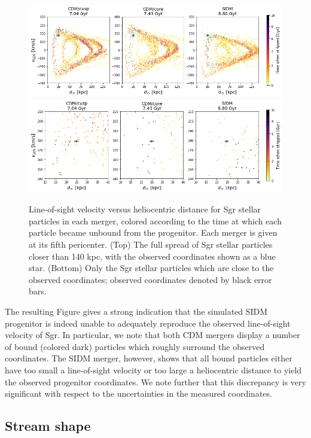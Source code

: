 \begin{figure}
    \centering
    \includegraphics[width=1.0\linewidth]{figs/vel_v_dist_peri_only.png}
    \includegraphics[width=1.0\linewidth]{figs/vel_v_dist_zoomed.png}
    \caption{%
        Line-of-sight velocity versus heliocentric distance for Sgr stellar
        particles in each merger, colored according to the time at which each
        particle became unbound from the progenitor. Each merger is given at its
        fifth pericenter. (Top) The full spread of Sgr stellar particles closer
        than 140 kpc, with the observed coordinates shown as a blue star.
        (Bottom) Only the Sgr stellar particles which are close to the observed
        coordinates; observed coordinates denoted by black error bars.
    }
    \label{fig:vel_v_dist}
\end{figure}

The resulting Figure gives a strong indication that the simulated SIDM
progenitor is indeed unable to adequately reproduce the observed line-of-sight
velocity of Sgr.  In particular, we note that both CDM mergers display a
number of bound (colored dark) particles which roughly surround the observed
coordinates.  The SIDM merger, however, shows that all bound particles either
have too small a line-of-sight velocity or too large a heliocentric distance
to yield the observed progenitor coordinates.  We note further that this
discrepancy is very significant with respect to the uncertainties in the
measured coordinates.


\hypertarget{stream-shape}{%
\subsection{Stream shape}\label{stream-shape}}

